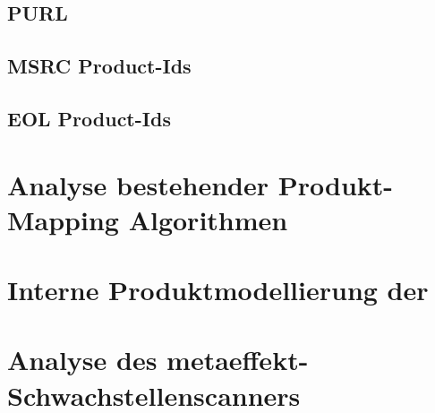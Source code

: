 \subsection{PURL}

\subsection{MSRC Product-Ids}

\subsection{EOL Product-Ids}


\section{Analyse bestehender Produkt-Mapping Algorithmen}


\section{Interne Produktmodellierung der \metaeffektlg}


\section{Analyse des metaeffekt-Schwachstellenscanners}
